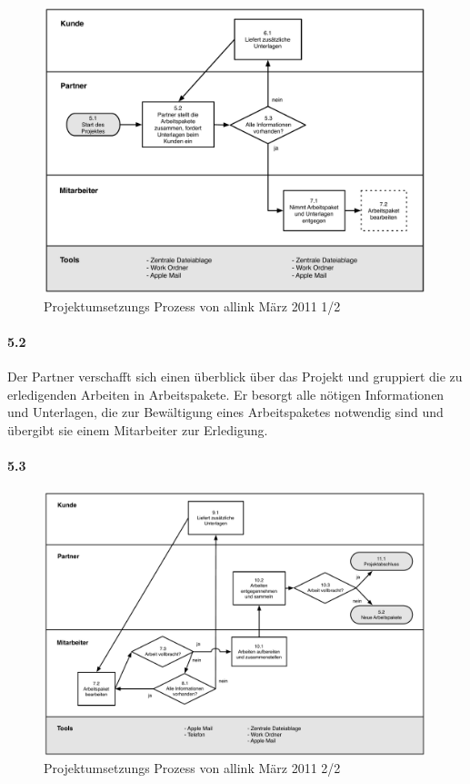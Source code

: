 \begin{figure}[htbp]
\begin{center}
\includegraphics[width=0.99\textwidth,angle=0]{./bilder/02_ist_prozesse_arbeit_01.pdf}
\caption{Projektumsetzungs Prozess von allink März 2011 1/2}
\label{pic:02_ist_prozesse_arbeit_01}
\end{center}
\end{figure}

\paragraph{5.2}
Der Partner verschafft sich einen überblick über das Projekt und gruppiert
die zu erledigenden Arbeiten in Arbeitspakete. Er besorgt alle nötigen Informationen
und Unterlagen, die zur Bewältigung eines Arbeitspaketes notwendig sind und
übergibt sie einem Mitarbeiter zur Erledigung.

\paragraph{5.3}


\begin{figure}[htbp]
\begin{center}
\includegraphics[width=0.99\textwidth,angle=0]{./bilder/02_ist_prozesse_arbeit_02.pdf}
\caption{Projektumsetzungs Prozess von allink März 2011 2/2}
\label{pic:02_ist_prozesse_arbeit_02}
\end{center}
\end{figure}

